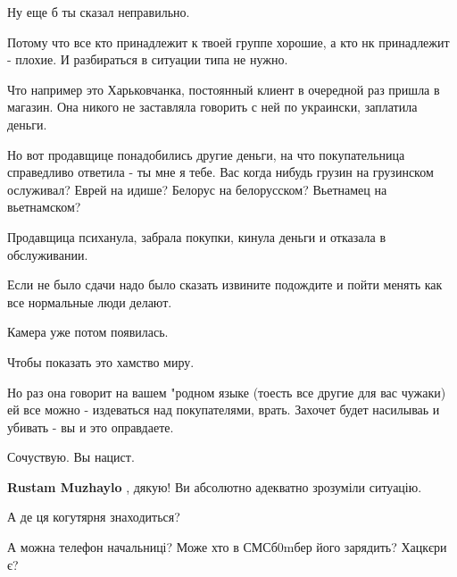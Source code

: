 \begin{itemize}
\begin{itemize}
 

Ну еще б ты сказал неправильно.

Потому что все кто принадлежит к твоей группе хорошие, а кто нк принадлежит -
плохие. И разбираться в ситуации типа не нужно.

Что например это Харьковчанка, постоянный клиент в очередной раз пришла в
магазин. Она никого не заставляла говорить с ней по украински, заплатила
деньги.

Но вот продавщице понадобились другие деньги, на что покупательница справедливо
ответила - ты мне я тебе. Вас когда нибудь грузин на грузинском ослуживал?
Еврей на идише? Белорус на белорусском? Вьетнамец на вьетнамском?

Продавщица психанула, забрала покупки, кинула деньги и отказала в обслуживании.

Если не было сдачи надо было сказать извините подождите и пойти менять как все
нормальные люди делают.

Камера уже потом появилась.

Чтобы показать это хамство миру.

Но раз она говорит на вашем "родном языке (тоесть все другие для вас чужаки) ей
все можно - издеваться над покупателями, врать. Захочет будет насилываь и
убивать - вы и это оправдаете.

Сочуствую. Вы нацист.

 
\textbf{Rustam Muzhaylo} , дякую! Ви абсолютно адекватно зрозуміли ситуацію.

\end{itemize}

 

А де ця когутярня знаходиться?

А можна телефон начальниці? Може хто в СМСб0mбер його зарядить? Хацкєри є? \Smiley[1.0][yellow]


\end{itemize}

